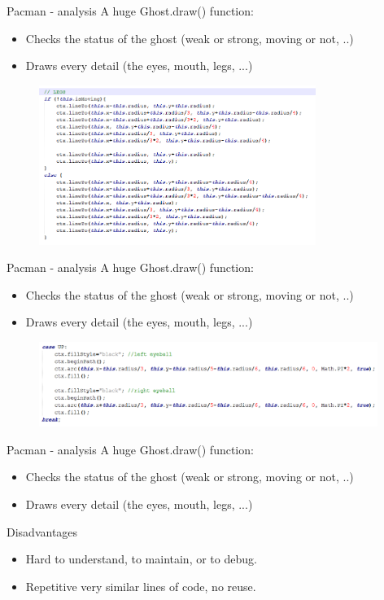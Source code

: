 \documentclass{beamer}
\begin{document}
\begin{frame}{Pacman - analysis}
A huge Ghost.draw() function:
 \begin{itemize}
      \item Checks the status of the ghost (weak or strong, moving or not, ..)
      \item Draws every detail (the eyes, mouth, legs, ...)
    \end{itemize}
   \begin{figure}[htp]
    \centering
    \includegraphics[width=9cm]{pics/Legs}
    \label{fig:legs}
    \end{figure}
\end{frame}

\begin{frame}{Pacman - analysis}
A huge Ghost.draw() function:
 \begin{itemize}
      \item Checks the status of the ghost (weak or strong, moving or not, ..)
      \item Draws every detail (the eyes, mouth, legs, ...)
    \end{itemize}
   \begin{figure}[htp]
    \centering
    \includegraphics[width=11cm]{pics/Code}
    \label{fig:eyes}
    \end{figure}
\end{frame}

\begin{frame}{Pacman - analysis}
A huge Ghost.draw() function:
 \begin{itemize}
      \item Checks the status of the ghost (weak or strong, moving or not, ..)
      \item Draws every detail (the eyes, mouth, legs, ...)
    \end{itemize}
 \begin{block}{Disadvantages}
      \begin{itemize} 
    \item Hard to understand, to maintain, or to debug.
    \item Repetitive very similar lines of code, no reuse.
    \end{itemize}
    \end{block}
\end{frame}
\end{document}
